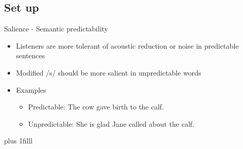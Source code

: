 \documentclass{beamer}
\newcommand{\btVFill}{\vskip0pt plus 1filll}
\begin{document}
\subsection{Set up}

\begin{frame}{Salience - Semantic predictability}

\begin{itemize}
\item Listeners are more tolerant of acoustic reduction or noise in predictable sentences
\item Modified /s/ should be more salient in unpredictable words
\item Examples
\begin{itemize}
\item Predictable: The cow gave birth to the calf.
\item Unpredictable: She is glad Jane called about the calf.
\end{itemize}
\end{itemize}
\btVFill
\begin{flushright}
\scriptsize
\citet{Lieberman1963, Kalikow1977, Scarborough2010}
\end{flushright}
\end{frame}
\end{document}
